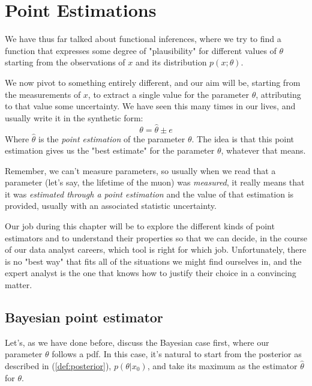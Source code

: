\chapter{Point Estimations}
We have thus far talked about functional inferences, where we try to find a function that expresses some degree of "plausibility" for different values of $\theta$ starting from the observations of $x$ and its distribution $p(x;\theta)$. 

We now pivot to something entirely different, and our aim will be, starting from the measurements of $x$, to extract a single value for the parameter $\theta$, attributing to that value some uncertainty. We have seen this many times in our lives, and usually write it in the synthetic form:
	\[
	\theta = \hat{\theta} \pm e
	\]
Where $\hat{\theta}$ is the \emph{point estimation} of the parameter $\theta$. The idea is that this point estimation gives us the "best estimate" for the parameter $\theta$, whatever that means. 

Remember, we can't measure parameters, so usually when we read that a parameter (let's say, the lifetime of the muon) was \emph{measured}, it really means that it was \emph{estimated through a point estimation} and the value of that estimation is provided, usually with an associated statistic uncertainty. 

Our job during this chapter will be to explore the different kinds of point estimators and to understand their properties so that we can decide, in the course of our data analyst careers, which tool is right for which job. Unfortunately, there is no "best way" that fits all of the situations we might find ourselves in, and the expert analyst is the one that knows how to justify their choice in a convincing matter.

\section{Bayesian point estimator}
Let's, as we have done before, discuss the Bayesian case first, where our parameter $\theta$ follows a pdf. In this case, it's natural to start from the posterior as described in (\ref{def:posterior}), $p(\theta|x_0)$, and take its maximum as the estimator $\hat{\theta}$ for $\theta$. 

